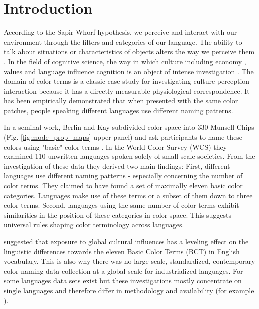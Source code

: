 \section{Introduction}

According to the Sapir-Whorf hypothesis, we perceive and interact with our environment through the filters and categories of our language. The ability to talk about situations or characteristics of objects alters the way we perceive them \parencite{blasi2022over,kramsch2014language, whorfLanguage2012}.
In the field of cognitive science, the way in which culture including economy \parencite{fine2016world,henrich2001search}, values \parencite{inglehart2000world,triandis2018individualism} and language influence cognition is an object of intense investigation \parencite{barrett2020towards, henrichWeirdest2010}. 
The domain of color terms is a classic case-study for investigating culture-perception interaction because it has a directly measurable physiological correspondence.
It has been empirically demonstrated that when presented with the same color patches, people speaking different languages use different naming patterns. 

In a seminal work, Berlin and Kay subdivided color space into 330 Munsell Chips (Fig. \ref{fig:mode_prop_maps} upper panel) and ask participants to name these colors using "basic" color terms \parencite{berlinBasic1969}.
In the World Color Survey (WCS) \parencite{kayWorld2009} they examined 110 unwritten languages spoken solely of small scale societies.
From the investigation of these data they derived two main findings: First, different languages use different naming patterns - especially concerning the number of color terms. They claimed to have found a set of maximally eleven basic color categories. Languages make use of these terms or a subset of them down to three color terms. 
Second, languages using the same number of color terms exhibit similarities in the position of these categories in color space. This suggests universal rules shaping color terminology across languages.

\textcite{berlinBasic1969} suggested that exposure to global cultural influences has a leveling effect on the linguistic differences towards the eleven Basic Color Terms (BCT) in English vocabulary.
This is also why there was no large-scale, standardized, contemporary color-naming data collection at a global scale for industrialized languages. 
For some languages data sets exist but these investigations mostly concentrate on single languages and therefore differ in methodology and availability (for example \cite{lindseyColor2014,al-rasheedFurther2014, daviesBasic1994, kurikiModern2017, ozgenTurkish1998, thierryUnconscious2009, zollingerWhy1984,winawerRussian2007,berlinBasic1969}).


